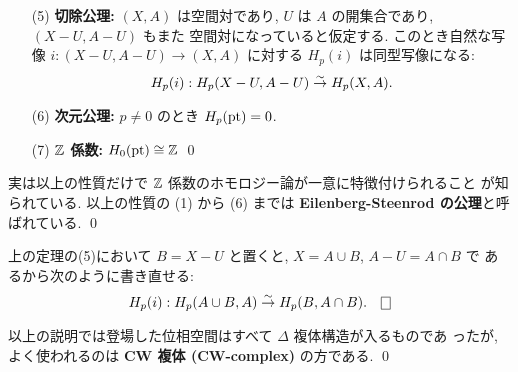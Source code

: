 \documentclass[12pt,twoside]{jarticle}
\begin{document}
\begin{theorem}[相対ホモロジー群の基本性質]
\begin{enumerate}
 \item[(5)] {\bf 切除公理:}
  $(X,A)$ は空間対であり, $U$ は $A$ の開集合であり, $(X-U,A-U)$ もまた
  空間対になっていると仮定する. このとき自然な写像 $i:(X-U,A-U)\to(X,A)$ 
  に対する $H_p(i)$ は同型写像になる:
  \begin{equation*}
   H_p(i): H_p(X-U, A-U) \overset\sim\rightarrow H_p(X,A).
  \end{equation*}
 \item[(6)] {\bf 次元公理:}
  $p\ne 0$ のとき $H_p(\mathop{\mathrm{pt}})=0$.
 \item[(7)] {\bf ${\mathbb Z}$ 係数:}
  $H_0(\mathop{\mathrm{pt}})\cong{\mathbb Z}$
  \qed
 \end{enumerate}
 実は以上の性質だけで ${\mathbb Z}$ 係数のホモロジー論が一意に特徴付けられること
 が知られている.
 以上の性質の (1) から (6) までは
 {\bf Eilenberg-Steenrod の公理}と呼ばれている.
 \qed
\end{theorem}

\begin{rem}[切除公理の書き直し]
 上の定理の(5)において $B=X-U$ と置くと, $X=A\cup B$, $A-U=A\cap B$ で
 あるから次のように書き直せる:
  \begin{equation*}
   H_p(i): H_p(A\cup B, A) \isomto H_p(B,A\cap B).
   \qed
 \end{equation*}
\end{rem}

\begin{rem}
 以上の説明では登場した位相空間はすべて $\Delta$ 複体構造が入るものであ
 ったが, よく使われるのは {\bf CW 複体 (CW-complex)} の方である.
 \qed
\end{rem}

\end{document}
